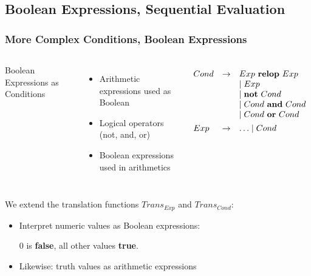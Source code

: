 \documentclass{beamer}
\renewcommand{\emph}[1]{\textcolor{structure}{#1}}
\begin{document}
\subsection{Boolean Expressions, Sequential Evaluation}

\begin{frame}
	\tableofcontents[currentsubsection]
\end{frame}


\begin{frame}[fragile]
	\frametitle{More Complex Conditions, Boolean Expressions}


\begin{columns}

\emph{Boolean Expressions as Conditions}
\begin{itemize}
\item Arithmetic expressions used as Boolean
\item Logical operators (not, and, or)
\item Boolean expressions used in arithmetics

\end{itemize}


{\footnotesize

\renewcommand{\arraystretch}{0.9}
\[\begin{array}{lcl}
Cond & \rightarrow & Exp~\mbox{\bf relop}~ Exp\\
& & \mid Exp\\
& & \mid \mbox{\bf not}~Cond\\
& & \mid Cond~\mbox{\bf and}~Cond\\
& & \mid Cond~\mbox{\bf or}~Cond\\[1ex]
Exp & \rightarrow & \ldots \mid Cond\\
\end{array}\]

}
\end{columns}

\bigskip
\bigskip

\pause
We extend the translation functions $Trans_{Exp}$ and $Trans_{Cond}$:

\begin{itemize}
\item \emph{Interpret numeric values} as Boolean expressions: 

	0 is \textbf{false}, all other values \textbf{true}.
\item Likewise: \emph{truth values as arithmetic expressions}

\end{itemize}

\end{frame}
\end{document}
